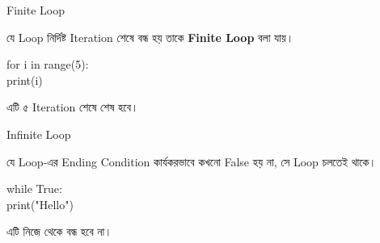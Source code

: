 \noindent
\begin{minipage}[t]{0.49\linewidth}

\begin{sideexamplebox}{Finite Loop}

যে Loop নির্দিষ্ট Iteration শেষে বন্ধ হয় তাকে
\textbf{Finite Loop} বলা যায়।

\begin{sidecodebox}
\begin{english}
\ttfamily
for i in range(5):\\
\hspace*{4mm}print(i)
\end{english}
\end{sidecodebox}

এটি ৫ Iteration শেষে শেষ হবে।

\end{sideexamplebox}

\end{minipage}
\hfill
\begin{minipage}[t]{0.49\linewidth}

\begin{sideexamplebox}{Infinite Loop}

যে Loop-এর Ending Condition কার্যকরভাবে কখনো False হয় না,
সে Loop চলতেই থাকে।

\begin{sidecodebox}
\begin{english}
\ttfamily
while True:\\
\hspace*{4mm}print("Hello")
\end{english}
\end{sidecodebox}

এটি নিজে থেকে বন্ধ হবে না।

\end{sideexamplebox}

\end{minipage}


